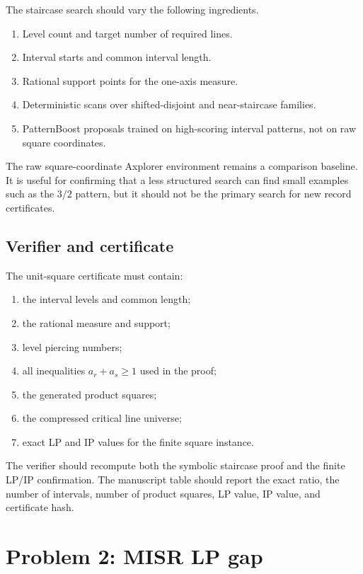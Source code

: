 \documentclass[11pt]{article}
\begin{document}
The staircase search should vary the following ingredients.

\begin{enumerate}
\item Level count and target number of required lines.
\item Interval starts and common interval length.
\item Rational support points for the one-axis measure.
\item Deterministic scans over shifted-disjoint and near-staircase families.
\item PatternBoost proposals trained on high-scoring interval patterns, not on
raw square coordinates.
\end{enumerate}

The raw square-coordinate Axplorer environment remains a comparison baseline.
It is useful for confirming that a less structured search can find small
examples such as the $3/2$ pattern, but it should not be the primary search for
new record certificates.

\subsection{Verifier and certificate}

The unit-square certificate must contain:
\begin{enumerate}
\item the interval levels and common length;
\item the rational measure and support;
\item level piercing numbers;
\item all inequalities $a_r+a_s\geq 1$ used in the proof;
\item the generated product squares;
\item the compressed critical line universe;
\item exact LP and IP values for the finite square instance.
\end{enumerate}

The verifier should recompute both the symbolic staircase proof and the finite
LP/IP confirmation.  The manuscript table should report the exact ratio, the
number of intervals, number of product squares, LP value, IP value, and
certificate hash.

\section{Problem 2: MISR LP gap}
\end{document}
